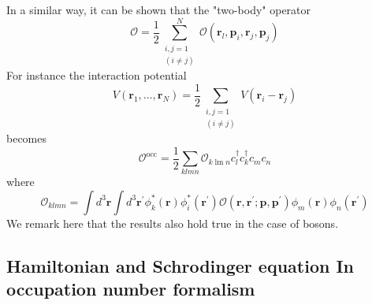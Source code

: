In a similar way, it can be shown that the "two-body" operator
\begin{equation}\mathcal{O}=\frac{1}{2} \sum_{\substack{i, j=1\\(i \neq j)}}^{N} \mathcal{O}\left(\mathbf{r}_{l}, \mathbf{p}_{i}, \mathbf{r}_{j}, \mathbf{p}_{j}\right)\end{equation}
For instance the interaction potential
\begin{equation}V\left(\mathbf{r}_{1}, \dots, \mathbf{r}_{N}\right)=\frac{1}{2} \sum_{\substack{i, j=1\\ (i \neq j)}} V\left(\mathbf{r}_{i}-\mathbf{r}_{j}\right)\end{equation}
becomes
\begin{equation}\mathcal{O}^{\mathrm{occ}}=\frac{1}{2} \sum_{k l m n} \mathcal{O}_{k \operatorname{lm} n} c_{l}^{\dagger} c_{k}^{\dagger} c_{m} c_{n}\end{equation}
where
\begin{equation}\mathcal{O}_{klmn}=\int d^{3} \mathbf{r} \int d^{3} \mathbf{r}^{\prime} \phi_{k}^{*}(\mathbf{r}) \phi_{i}^{*}\left(\mathbf{r}^{\prime}\right) \mathcal{O}\left(\mathbf{r}, \mathbf{r}^{\prime} ; \mathbf{p}, \mathbf{p}^{\prime}\right) \phi_{m}(\mathbf{r}) \phi_{n}\left(\mathbf{r}^{\prime}\right)\end{equation}
We remark here that the results also hold true in the case of bosons.

\subsection{Hamiltonian and Schrodinger equation In occupation number formalism}